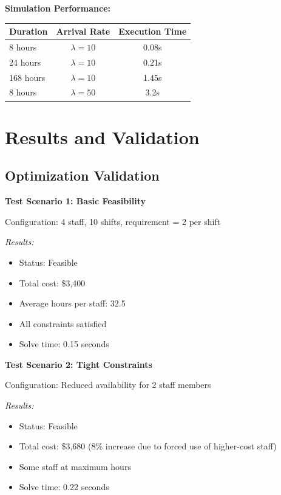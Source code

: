 \documentclass[12pt,a4paper]{article}
\begin{document}
\textbf{Simulation Performance:}
\begin{center}
\begin{tabular}{lcc}
\toprule
Duration & Arrival Rate & Execution Time \\
\midrule
8 hours & $\lambda = 10$ & 0.08s \\
24 hours & $\lambda = 10$ & 0.21s \\
168 hours & $\lambda = 10$ & 1.45s \\
8 hours & $\lambda = 50$ & 3.2s \\
\bottomrule
\end{tabular}
\end{center}

\newpage

\section{Results and Validation}
\label{sec:results}

\subsection{Optimization Validation}
\label{subsec:opt-validation}

\textbf{Test Scenario 1: Basic Feasibility}

Configuration: 4 staff, 10 shifts, requirement = 2 per shift

\textit{Results:}
\begin{itemize}
    \item Status: Feasible
    \item Total cost: \$3,400
    \item Average hours per staff: 32.5
    \item All constraints satisfied
    \item Solve time: 0.15 seconds
\end{itemize}

\textbf{Test Scenario 2: Tight Constraints}

Configuration: Reduced availability for 2 staff members

\textit{Results:}
\begin{itemize}
    \item Status: Feasible
    \item Total cost: \$3,680 (8\% increase due to forced use of higher-cost staff)
    \item Some staff at maximum hours
    \item Solve time: 0.22 seconds
\end{itemize}
\end{document}
